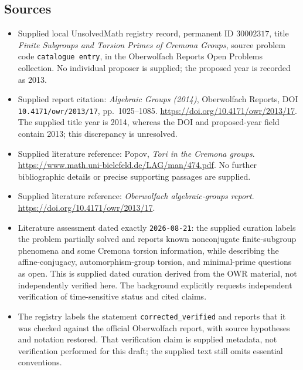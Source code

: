\documentclass[11pt]{article}
\begin{document}
\subsection{Sources}
\begin{itemize}
\item Supplied local UnsolvedMath registry record, permanent ID \(30002317\), title \emph{Finite Subgroups and Torsion Primes of Cremona Groups}, source problem code \texttt{catalogue entry}, in the Oberwolfach Reports Open Problems collection. No individual proposer is supplied; the proposed year is recorded as 2013.
\item Supplied report citation: \emph{Algebraic Groups (2014)}, Oberwolfach Reports, DOI \texttt{10.4171/owr/2013/17}, pp.\ 1025--1085. \url{https://doi.org/10.4171/owr/2013/17}. The supplied title year is 2014, whereas the DOI and proposed-year field contain 2013; this discrepancy is unresolved.
\item Supplied literature reference: Popov, \emph{Tori in the Cremona groups}. \url{https://www.math.uni-bielefeld.de/LAG/man/474.pdf}. No further bibliographic details or precise supporting passages are supplied.
\item Supplied literature reference: \emph{Oberwolfach algebraic-groups report}. \url{https://doi.org/10.4171/owr/2013/17}.
\item Literature assessment dated exactly \texttt{2026-08-21}: the supplied curation labels the problem partially solved and reports known nonconjugate finite-subgroup phenomena and some Cremona torsion information, while describing the affine-conjugacy, automorphism-group torsion, and minimal-prime questions as open. This is supplied dated curation derived from the OWR material, not independently verified here. The background explicitly requests independent verification of time-sensitive status and cited claims.
\item The registry labels the statement \texttt{corrected\_verified} and reports that it was checked against the official Oberwolfach report, with source hypotheses and notation restored. That verification claim is supplied metadata, not verification performed for this draft; the supplied text still omits essential conventions.
\end{itemize}
\end{document}
